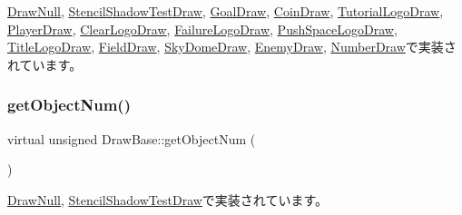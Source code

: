 \mbox{\hyperlink{class_draw_null_a7586cc78eed6bcaf2972ad7a6a70e665}{Draw\+Null}}, \mbox{\hyperlink{class_stencil_shadow_test_draw_a285b3045ff5cc34b6b2b991cca434bb3}{Stencil\+Shadow\+Test\+Draw}}, \mbox{\hyperlink{class_goal_draw_ac80c8da78cda7b15a4ce46f7d7057622}{Goal\+Draw}}, \mbox{\hyperlink{class_coin_draw_a8ebedf2582d53b40016ebd3f0e82c38e}{Coin\+Draw}}, \mbox{\hyperlink{class_tutorial_logo_draw_a0e56784e25f1f83e6ff167280b801aad}{Tutorial\+Logo\+Draw}}, \mbox{\hyperlink{class_player_draw_ac618153d70492f73299c58a50d565431}{Player\+Draw}}, \mbox{\hyperlink{class_clear_logo_draw_a257f34e6f8325580f7df835f20d2ebb4}{Clear\+Logo\+Draw}}, \mbox{\hyperlink{class_failure_logo_draw_a45bb5d0965ca73b06ae0836f27f9b0e3}{Failure\+Logo\+Draw}}, \mbox{\hyperlink{class_push_space_logo_draw_abaa66b6e3c46aa03bae21bad271eebc0}{Push\+Space\+Logo\+Draw}}, \mbox{\hyperlink{class_title_logo_draw_a20a0e0c3569e49eb421ab4b5a65777cd}{Title\+Logo\+Draw}}, \mbox{\hyperlink{class_field_draw_a0894ddd73716f0db8ceed4b7d89f23fd}{Field\+Draw}}, \mbox{\hyperlink{class_sky_dome_draw_a6b281bafa71c058ee83c373ad978e3bb}{Sky\+Dome\+Draw}}, \mbox{\hyperlink{class_enemy_draw_a1d8a943e4b625795bbd5ae614cc38ed1}{Enemy\+Draw}}, \mbox{\hyperlink{class_number_draw_abcd88040b2b6d5dd7d21e8cfd50b1682}{Number\+Draw}}で実装されています。

\mbox{\label{class_draw_base_a57c010b4386dc09afa124fba81a6e0fc}} 
\subsubsection{\texorpdfstring{get\+Object\+Num()}{getObjectNum()}}
{\footnotesize\ttfamily virtual unsigned Draw\+Base\+::get\+Object\+Num (\begin{DoxyParamCaption}{ }\end{DoxyParamCaption})\hspace{0.3cm}{\ttfamily [pure virtual]}}



\mbox{\hyperlink{class_draw_null_ae71c0b03f98748a4eb1d2e2635bcc146}{Draw\+Null}}, \mbox{\hyperlink{class_stencil_shadow_test_draw_ad93f1c8a60a701d185108896c58dd578}{Stencil\+Shadow\+Test\+Draw}}で実装されています。

\mbox{\label{class_draw_base_a9f50a030778dbfca5ae45bb7908e0d58}} 
